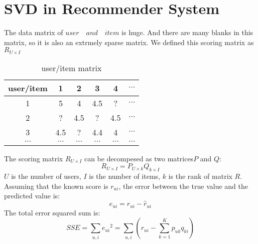 \documentclass[]{article}
\begin{document}
\section{SVD in Recommender System}
The data matrix of $user\quad and\quad item$ is huge.  And there are many blanks in this matrix,  so it is also an extrmely sparse matrix.  We defined this scoring matrix as $R_{U\times I}$
\begin{table}[H]
	\label{user/item matrix}
	\caption{user/item matrix}
	\centering
	\begin{tabular}{|c|c|c|c|c|c|}
		\hline 
		user/item&1&2&3&4&$\cdots$ \\ \hline
		1&5&4&4.5&?&$\cdots$ \\ \hline
		2&?&4.5&?&4.5&$\cdots$\\ \hline
		3&4.5&?&4.4&4&$\cdots$\\ \hline
		$\cdots$&$\cdots$&$\cdots$&$\cdots$&$\cdots$ &$\cdots$ \\ \hline
	\end{tabular}
\end{table} 
The scoring matrix $R_{U\times I}$ can be decompesed as two matrices$P$ and $Q$:
\begin{equation}
   R_{U \times I}=P_{U\times k}Q_{k\times I}
\end{equation}
$U$ is the number of users,  $I$ is the number of items,  $k$ is the rank of matrix $R$.\\
Assuming that the known score is $r_{ui}$,  the error between the true value and the predicted value is:
\begin{equation}
 e_{ui}=r_{ui}-{\widehat{r}}_{ui}
\end{equation} 
The total error squared sum is:
\begin{equation}
   SSE=\sum_{u,i}{e_{ui}}^{2}=\sum_{u,i}(r_{ui}-\sum_{k=1}^{K}p_{uk}q_{ki})
\end{equation}
\end{document}
